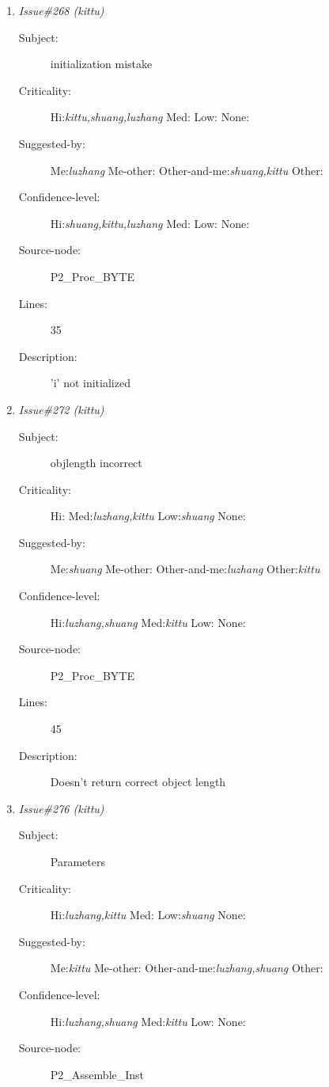 \begin{enumerate}
\begin{description}
\item [Lines:] 22

\item [Description:] incorrect assciival
\end{description}
\item {\it Issue\#268 (kittu)}
\begin{description}
\item [Subject:] initialization mistake
\item [Criticality:] Hi:{\it kittu,shuang,luzhang} Med:{\it } Low:{\it } None:{\it }
\item [Suggested-by:] Me:{\it luzhang} Me-other:{\it } Other-and-me:{\it shuang,kittu} Other:{\it }
\item [Confidence-level:] Hi:{\it shuang,kittu,luzhang} Med:{\it } Low:{\it } None:{\it }
\item [Source-node:] P2\_Proc\_BYTE

\item [Lines:] 35

\item [Description:] 'i' not initialized
\end{description}
\item {\it Issue\#272 (kittu)}
\begin{description}
\item [Subject:] objlength incorrect
\item [Criticality:] Hi:{\it } Med:{\it luzhang,kittu} Low:{\it shuang} None:{\it }
\item [Suggested-by:] Me:{\it shuang} Me-other:{\it } Other-and-me:{\it luzhang} Other:{\it kittu}
\item [Confidence-level:] Hi:{\it luzhang,shuang} Med:{\it kittu} Low:{\it } None:{\it }
\item [Source-node:] P2\_Proc\_BYTE

\item [Lines:] 45

\item [Description:] Doesn't return correct object length
\end{description}
\item {\it Issue\#276 (kittu)}
\begin{description}
\item [Subject:] Parameters
\item [Criticality:] Hi:{\it luzhang,kittu} Med:{\it } Low:{\it shuang} None:{\it }
\item [Suggested-by:] Me:{\it kittu} Me-other:{\it } Other-and-me:{\it luzhang,shuang} Other:{\it }
\item [Confidence-level:] Hi:{\it luzhang,shuang} Med:{\it kittu} Low:{\it } None:{\it }
\item [Source-node:] P2\_Assemble\_Inst


\end{description}
\end{enumerate}
